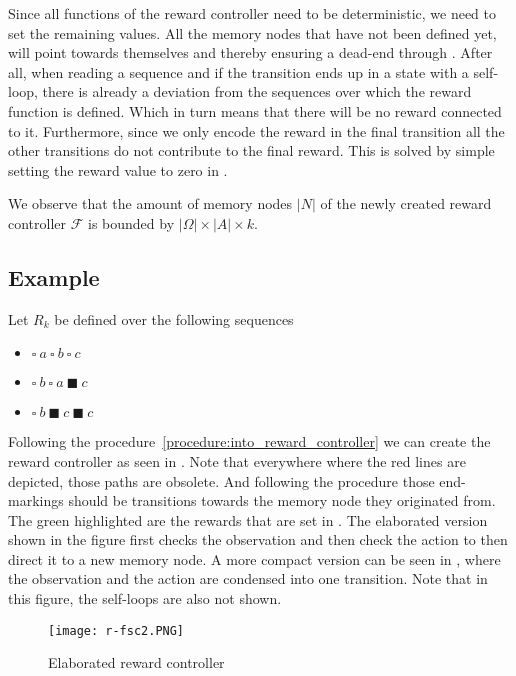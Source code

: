 Since all functions of the reward controller need to be deterministic, we need to set the remaining values. All the memory nodes that have not been defined yet, will point towards themselves and thereby ensuring a dead-end through . After all, when reading a sequence and if the transition ends up in a state with a self-loop, there is already a deviation from the sequences over which the reward function is defined. Which in turn means that there will be no reward connected to it. Furthermore, since we only encode the reward in the final transition all the other transitions do not contribute to the final reward. This is solved by simple setting the reward value to zero in .


We observe that the amount of memory nodes $|N|$ of the newly created reward controller $\mathcal{F}$ is bounded by $|\Omega|\times|A|\times k$.\\


\subsection*{Example}
Let $R_k$ be defined over the following sequences
\begin{itemize}
	\item $\square\ a\ \square\ b\ \square\ c$
	\item $\square\ b\ \square\ a\ \blacksquare\ c$
	\item $\square\ b\ \blacksquare\ c\ \blacksquare\ c$
\end{itemize}

Following the procedure~\ref{procedure:into_reward_controller} we can create the reward controller as seen in . Note that everywhere where the red lines are depicted, those paths are obsolete. And following the procedure those end-markings should be transitions towards the memory node they originated from. The green highlighted are the rewards that are set in . The elaborated version shown in the figure first checks the observation and then check the action to then direct it to a new memory node. A more compact version can be seen in , where the observation and the action are condensed into one transition. Note that in this figure, the self-loops are also not shown. 

\begin{figure}[H]
\centering
\texttt{[image: r-fsc2.PNG]}
\label{f:elaborated_rc}
\caption{Elaborated reward controller}
\end{figure}


